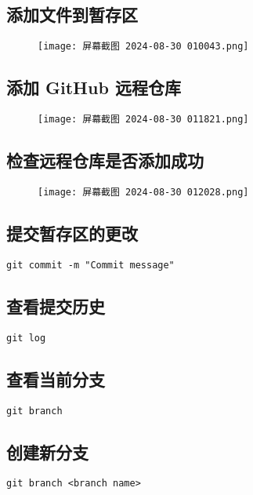 \documentclass[a4paper, 12pt]{article}
\begin{document}
\subsection{添加文件到暂存区}
\begin{figure}[h!]
    \centering
    \texttt{[image: 屏幕截图 2024-08-30 010043.png]}
\end{figure}

\subsection{添加 GitHub 远程仓库}
\begin{figure}[h!]
    \centering
    \texttt{[image: 屏幕截图 2024-08-30 011821.png]}
\end{figure}

\subsection{检查远程仓库是否添加成功}
\begin{figure}[h!]
    \centering
    \texttt{[image: 屏幕截图 2024-08-30 012028.png]}
\end{figure}

\subsection{提交暂存区的更改}
\begin{lstlisting}
git commit -m "Commit message"
\end{lstlisting}

\subsection{查看提交历史}
\begin{lstlisting}
git log 
\end{lstlisting}

\subsection{查看当前分支}
\begin{lstlisting}
git branch
\end{lstlisting}

\subsection{创建新分支}
\begin{lstlisting}
git branch <branch name>
\end{lstlisting}
\end{document}
